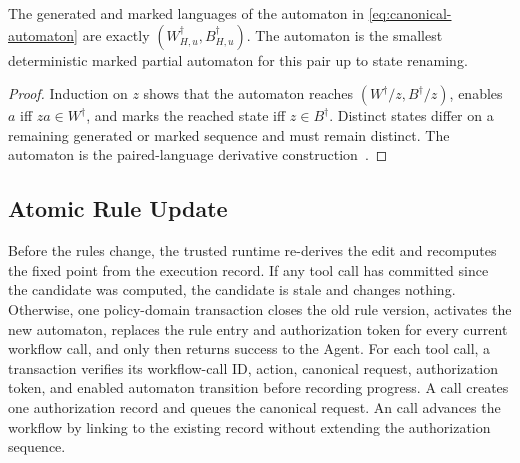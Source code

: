 \begin{lemma}
\label{lem:runtime-language}
The generated and marked languages of the automaton in \cref{eq:canonical-automaton} are exactly \((W^\dagger_{H,u},B^\dagger_{H,u})\).
The automaton is the smallest deterministic marked partial automaton for this pair up to state renaming.
\end{lemma}
\begin{proof}
Induction on \(z\) shows that the automaton reaches \((W^\dagger/z,B^\dagger/z)\), enables \(a\) iff \(za\in W^\dagger\), and marks the reached state iff \(z\in B^\dagger\).
Distinct states differ on a remaining generated or marked sequence and must remain distinct.
The automaton is the paired-language derivative construction~\cite{brzozowski1964derivatives}.
\end{proof}

\subsection{Atomic Rule Update}

Before the rules change, the trusted runtime re-derives the edit and recomputes the fixed point from the execution record.
If any tool call has committed since the candidate was computed, the candidate is stale and changes nothing.
Otherwise, one policy-domain transaction closes the old rule version, activates the new automaton, replaces the rule entry and authorization token for every current workflow call, and only then returns success to the Agent.
For each tool call, a transaction verifies its workflow-call ID, action, canonical request, authorization token, and enabled automaton transition before recording progress.
A \Fresh call creates one authorization record and queues the canonical request.
An \Alias call advances the workflow by linking to the existing record without extending the authorization sequence.

